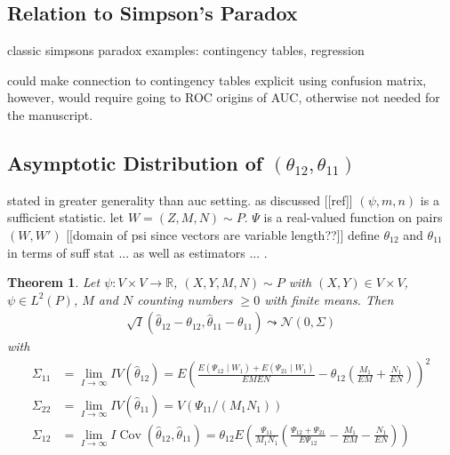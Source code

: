 \message{ !name(manuscript.tex)}\documentclass[12pt]{article}
\DeclareMathOperator{\AUC}{AUC}
\DeclareMathOperator{\V}{Var}
\DeclareMathOperator{\cov}{Cov}
\newcommand{\I}{I}
\newcommand{\E}{E}
\renewcommand{\P}{P}
\newcommand{\cind}{\perp \!\!\! \perp}
\newcommand{\aucindiv}{\theta_{11}}%
\newcommand{\aucpop}{\theta_{12}}%
\newcommand{\aucindivhat}{\hat{\theta}_{11}}%
\newcommand{\aucpophat}{\hat{\theta}_{12}}%
\newcommand{\Kernel}{\Psi}
\newcommand{\W}{W}
\renewcommand{\V}{V}
\newtheorem{theorem}{Theorem}
\begin{document}
\subsection{Relation to Simpson's Paradox}
classic simpsons paradox examples: contingency tables, regression

could make connection to contingency tables explicit using confusion
matrix, however, would require going to ROC origins of AUC, otherwise
not needed for the manuscript.









\subsection{Asymptotic Distribution of $(\aucpop,\aucindiv)$}

stated in greater generality than auc setting. as discussed [[ref]]
$(\psi,m,n)$ is a sufficient statistic. let $W=(Z,M,N)\sim
P$. $\Kernel$ is a real-valued function on pairs $(W,W')$ [[domain of
psi since vectors are variable length??]]  define $\aucpop$ and
$\aucindiv$ in terms of suff stat ... as well as estimators ... .

\begin{theorem}\label{theorem:asymptotic} Let $\psi:V\times V\to\mathbb{R}$, $(X,Y,M,N)\sim\P$ with $(X,Y)\in V\times V$, $\psi\in L^2(\P)$, $M$ and $N$ counting numbers $\ge 0$ with finite means. Then
  \begin{align}
    \sqrt{\I}(\aucpophat-\aucpop,\aucindivhat-\aucindiv) \leadsto \mathcal{N}(0,\Sigma)
  \end{align}
  with
  \begin{align}
    \Sigma_{11} &= \lim_{\I\to\infty} \I\V(\aucpophat) =
    \E\left(\frac{\E(\Kernel_{12}\mid\W_1)+\E(\Kernel_{21}\mid\W_1)}{\E M\E N} - \aucpop\left(\frac{M_1}{\E M} + \frac{N_1}{\E N}\right)   \right)^2
    \\
    \Sigma_{22} &= \lim_{\I\to\infty} \I\V(\aucindivhat) =
    \V(\Kernel_{11}/(M_1N_1))
    \\
    \Sigma_{12} &= \lim_{\I\to\infty} \I\cov(\aucpophat,\aucindivhat) =
    \aucpop\E\left(\frac{\Kernel_{11}}{M_1N_1}\left(\frac{\Kernel_{12}+\Kernel_{21}}{\E\Kernel_{12}} - \frac{M_1}{\E M}-\frac{N_1}{\E N}  \right) \right)
  \end{align}
\end{theorem}
\end{document}

